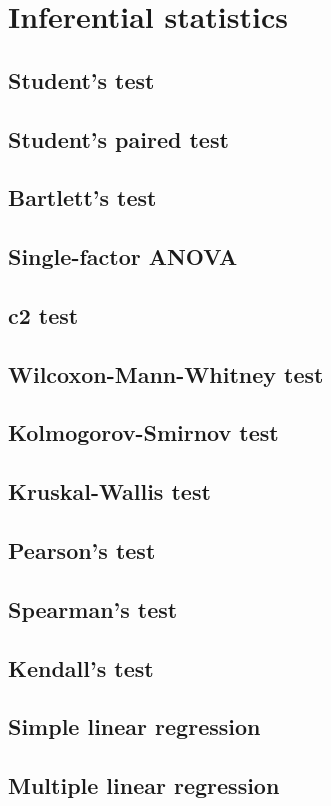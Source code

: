 \documentclass{report}
\begin{document}
\chapter{Inferential statistics}
	\section{Student’s test}
	\section{Student’s paired test}
	\section{Bartlett’s test}
	\section{Single-factor ANOVA}
	\section{c2 test}
	\section{Wilcoxon-Mann-Whitney test}
	\section{Kolmogorov-Smirnov test}
	\section{Kruskal-Wallis test}
	\section{Pearson’s test}
	\section{Spearman’s test}
	\section{Kendall’s test}
	\section{Simple linear regression}
	\section{Multiple linear regression}
\end{document}
